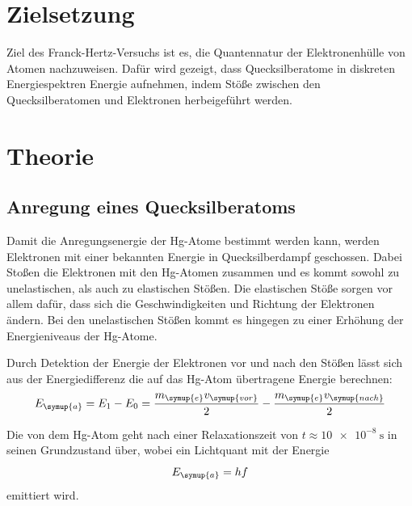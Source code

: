 \section{Zielsetzung}
Ziel des Franck-Hertz-Versuchs ist es, die Quantennatur der Elektronenhülle von Atomen nachzuweisen. Dafür wird gezeigt, dass 
Quecksilberatome in diskreten Energiespektren Energie aufnehmen, indem Stöße zwischen den Quecksilberatomen und Elektronen 
herbeigeführt werden.

\section{Theorie}
\label{sec:Theorie}
\subsection{Anregung eines Quecksilberatoms}
\label{sec:Anregung}
Damit die Anregungsenergie der Hg-Atome bestimmt werden kann, werden Elektronen mit einer bekannten Energie in Quecksilberdampf 
geschossen. Dabei Stoßen die Elektronen mit den Hg-Atomen zusammen und es kommt sowohl zu unelastischen, als auch zu elastischen 
Stößen.
Die elastischen Stöße sorgen vor allem dafür, dass sich die Geschwindigkeiten und Richtung der Elektronen ändern. Bei den unelastischen
Stößen kommt es hingegen zu einer Erhöhung der Energieniveaus der Hg-Atome.

Durch Detektion der Energie der Elektronen vor und nach den Stößen lässt sich aus der Energiedifferenz die auf das Hg-Atom übertragene
Energie berechnen:
\begin{equation}
    E_{\symup{a}} = E_1-E_0 = \frac{m_{\symup{e}}v_{\symup{vor}}}{2}-\frac{m_{\symup{e}}v_{\symup{nach}}}{2}
    \label{eq:Anregungsenergie}
\end{equation}

Die von dem Hg-Atom geht nach einer Relaxationszeit von $t\approx\qty{10e-8}{\second}$ in seinen Grundzustand über,
wobei ein Lichtquant mit der Energie
\begin{equation}
    E_{\symup{a}} = hf
    \label{eq:Einstein ist smart}
\end{equation}
emittiert wird.

